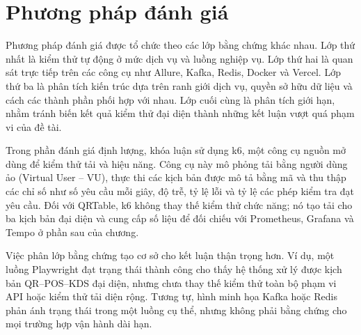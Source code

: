 \section{Phương pháp đánh giá}

Phương pháp đánh giá được tổ chức theo các lớp bằng chứng khác nhau. Lớp thứ nhất là kiểm thử tự động ở mức dịch vụ và luồng nghiệp vụ. Lớp thứ hai là quan sát trực tiếp trên các công cụ như Allure, Kafka, Redis, Docker và Vercel. Lớp thứ ba là phân tích kiến trúc dựa trên ranh giới dịch vụ, quyền sở hữu dữ liệu và cách các thành phần phối hợp với nhau. Lớp cuối cùng là phân tích giới hạn, nhằm tránh biến kết quả kiểm thử đại diện thành những kết luận vượt quá phạm vi của đề tài.

Trong phần đánh giá định lượng, khóa luận sử dụng k6, một công cụ nguồn mở dùng để kiểm thử tải và hiệu năng. Công cụ này mô phỏng tải bằng người dùng ảo (Virtual User -- VU), thực thi các kịch bản được mô tả bằng mã và thu thập các chỉ số như số yêu cầu mỗi giây, độ trễ, tỷ lệ lỗi và tỷ lệ các phép kiểm tra đạt yêu cầu. Đối với QRTable, k6 không thay thế kiểm thử chức năng; nó tạo tải cho ba kịch bản đại diện và cung cấp số liệu để đối chiếu với Prometheus, Grafana và Tempo ở phần sau của chương.

Việc phân lớp bằng chứng tạo cơ sở cho kết luận thận trọng hơn. Ví dụ, một luồng Playwright đạt trạng thái thành công cho thấy hệ thống xử lý được kịch bản QR--POS--KDS đại diện, nhưng chưa thay thế kiểm thử toàn bộ phạm vi API hoặc kiểm thử tải diện rộng. Tương tự, hình minh họa Kafka hoặc Redis phản ánh trạng thái trong một luồng cụ thể, nhưng không phải bằng chứng cho mọi trường hợp vận hành dài hạn.

